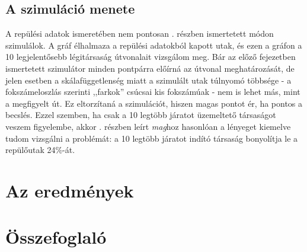     \subsection{A szimuláció menete}
    A repülési adatok ismeretében nem pontosan . részben ismertetett módon szimulálok. A gráf élhalmaza a repülési adatokból kapott utak, és ezen a gráfon a 10 legjelentősebb légitársaság útvonalait vizsgálom meg. Bár az előző fejezetben ismertetett szimulátor minden pontpárra előírná az útvonal meghatározását, de jelen esetben a skálafüggetlenség miatt a szimulált utak túlnyomó többsége - a fokszámeloszlás szerinti ,,farkok'' csúcsai kis fokszámúak - nem is lehet más, mint a megfigyelt út. Ez eltorzítaná a szimulációt, hiszen magas pontot ér, ha pontos a becslés. Ezzel szemben, ha csak a 10 legtöbb járatot üzemeltető társaságot veszem figyelembe, akkor . részben leírt \textit{mag}hoz hasonlóan a lényeget kiemelve tudom vizsgálni a problémát: a 10 legtöbb járatot indító társaság bonyolítja le a repülőutak 24\%-át.

  \section{Az eredmények}

  \section{Összefoglaló}
